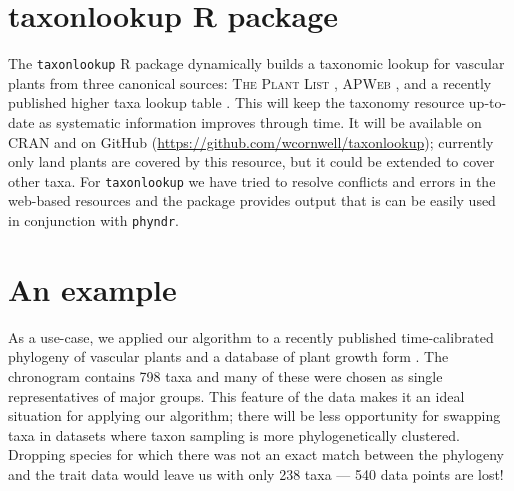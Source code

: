 \documentclass[a4paper,11pt]{article}
\newcommand{\phyndr}{\tt phyndr}
\newcommand{\taxonlookup}{\tt taxonlookup}
\begin{document}
\section{taxonlookup R package}

The {\taxonlookup} R package dynamically builds a taxonomic lookup for vascular plants from three canonical sources: \textsc{The Plant List} \citep{ThePlantList}, \textsc{APWeb} \citep{apweb}, and a recently published higher taxa lookup table \citep[][compiled by D.C. Tank, J.M. Eastman, J.M. Beaulieu, W.K. Cornwell, P.F. Stevens, and A.E. Zanne]{ZanneDryad}.  This will keep the taxonomy resource up-to-date as systematic information improves through time.  It will be available on CRAN and on GitHub (\url{https://github.com/wcornwell/taxonlookup}); currently only land plants are covered by this resource, but it could be extended to cover other taxa. For {\taxonlookup} we have tried to resolve conflicts and errors in the web-based resources and the package provides output that is can be easily used in conjunction with {\phyndr}.

\section{An example}

As a use-case, we applied our algorithm to a recently published time-calibrated phylogeny of vascular plants \citep{Magallon2015} and a database of plant growth form \citep{Zanne}. The \citet{Magallon2015} chronogram contains 798 taxa and many of these were chosen as single representatives of major groups. This feature of the data makes it an ideal situation for applying our algorithm; there will be less opportunity for swapping taxa in datasets where taxon sampling is more phylogenetically clustered. Dropping species for which there was not an exact match between the phylogeny and the trait data would leave us with only 238 taxa --- 540 data points are lost!
\end{document}
